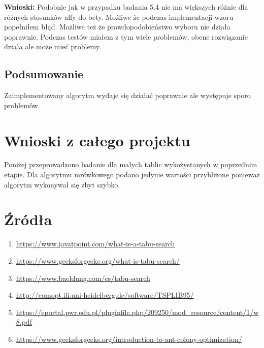 \documentclass{article}
\begin{document}
        \FloatBarrier
        \textbf{Wnioski: } Podobnie jak w przypadku badania 5.4 nie ma większych różnic
        dla różnych stosunków alfy do bety. Możliwe że podczas implementacji wzoru 
        popełniłem błąd. Możliwe też że prawdopodobieństwo wyboru nie działa poprawnie.
        Podczas testów miałem z tym wiele problemów, obene rozwiązanie działa ale może mieć problemy.
      \subsection{Podsumowanie}
        Zaimplementowany algorytm wydaje się działać poprawnie ale występuje sporo problemów. 
    \section{Wnioski z całego projektu}
      Poniżej przeprowadzono badanie dla małych tablic wykożystanych w poprzednim etapie. Dla 
      algorytmu mrówkowego podano jedynie wartości przybliżone ponieważ algorytm wykonywał się
      zbyt szybko.  
      
      \FloatBarrier
      
      \FloatBarrier
      
      \FloatBarrier
    \section{Źródła}
      \begin{enumerate}[label=\arabic*.]
        \item \url{https://www.javatpoint.com/what-is-a-tabu-search}
        \item \url{https://www.geeksforgeeks.org/what-is-tabu-search/}
        \item \url{https://www.baeldung.com/cs/tabu-search}
        \item \url{http://comopt.ifi.uni-heidelberg.de/software/TSPLIB95/} \label{src:TspLib}
        \item \url{https://eportal.pwr.edu.pl/pluginfile.php/209250/mod_resource/content/1/w8.pdf}
        \item \url{https://www.geeksforgeeks.org/introduction-to-ant-colony-optimization/}
      \end{enumerate}
\end{document}
